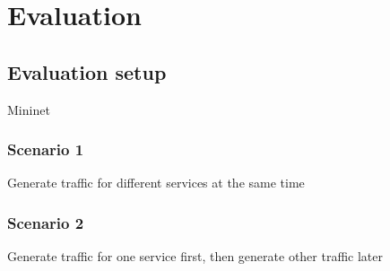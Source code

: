 \section{Evaluation}
\label{sect:experiment}
\subsection{Evaluation setup}
Mininet
\subsubsection{Scenario 1}
Generate traffic for different services at the same time

\subsubsection{Scenario 2}
Generate traffic for one service first, then generate other traffic later  



